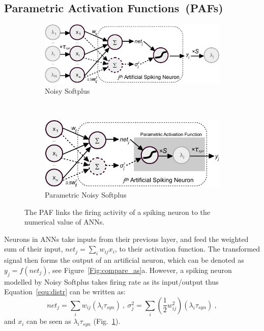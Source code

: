 \documentclass{article}
\begin{document}
\subsection{Parametric Activation Functions~(PAFs)}
\begin{figure}[tbh!]
	\centering
	\begin{subfigure}[t]{0.49\textwidth}
		\includegraphics[width=\textwidth]{pics_iconip/neuron_o.pdf}
		\caption{Noisy Softplus}
    \label{fig:noisy-softplus-neuron}
	\end{subfigure}~~~
	\begin{subfigure}[t]{0.42\textwidth}
		\includegraphics[width=\textwidth]{pics_iconip/neuron_PAF.pdf}
		\caption{Parametric Noisy Softplus}
    \label{fig:parametric-noisy-softplus-neuron}
	\end{subfigure}
	\caption{The PAF links the firing activity of a spiking neuron to the numerical value of ANNs.}
	\label{Fig:tneuron}
\end{figure}


Neurons in ANNs take inputs from their previous layer, and feed the weighted sum of their input, $net_j = \sum_i w_{ij}x_i$, to their activation function.
The transformed signal then forms the output of an artificial neuron, which can be denoted as $y_j=f(net_j)$, see Figure~\ref{Fig:compare_as}a.
However, a spiking neuron modelled by Noisy Softplus takes firing rate as its input/output thus Equation~\ref{equ:distr} can be written as:
\begin{equation}
net_j = \sum_i w_{ij}(\lambda_{i}\tau_{syn})~,
~\sigma^2_j= \sum_i (\frac{1}{2} w_{ij}^2)(\lambda_{i}\tau_{syn})~, 
\label{equ:mi_input}
\end{equation}
and $x_{i}$ can be seen as $\lambda_{i}\tau_{syn}$ (Fig.~\ref{fig:noisy-softplus-neuron}).
\end{document}
